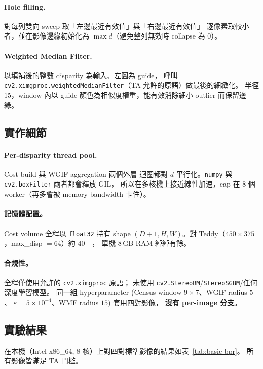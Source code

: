 \documentclass[11pt,a4paper]{article}
\begin{document}
\paragraph{Hole filling.} 對每列雙向 sweep 取「左邊最近有效值」與「右邊最近有效值」
逐像素取較小者，並在影像邊緣初始化為 $\max\!d$（避免整列無效時 collapse 為 0）。

\paragraph{Weighted Median Filter.} 以填補後的整數 disparity 為輸入、左圖為 guide，
呼叫 \texttt{cv2.ximgproc.weightedMedianFilter}（TA 允許的原語）做最後的細緻化。
半徑 15，window 內以 guide 顏色為相似度權重，能有效消除細小 outlier 而保留邊緣。

\subsection{實作細節}
\paragraph{Per-disparity thread pool.} Cost build 與 WGIF aggregation 兩個外層
迴圈都對 $d$ 平行化。\texttt{numpy} 與 \texttt{cv2.boxFilter} 兩者都會釋放 GIL，
所以在多核機上接近線性加速，cap 在 8 個 worker（再多會被 memory bandwidth
卡住）。

\paragraph{記憶體配置。} Cost volume 全程以 \texttt{float32} 持有
shape $(D{+}1, H, W)$。對 Teddy（$450\!\times\!375$，max\_disp $=64$）約 \SI{40}{\mebi\byte}，
單機 8\,GB RAM 綽綽有餘。

\paragraph{合規性。} 全程僅使用允許的 \texttt{cv2.ximgproc} 原語；
未使用 \texttt{cv2.StereoBM}/\texttt{StereoSGBM}/任何深度學習模型。
同一組 hyperparameter (Census window $9\!\times\!7$、WGIF radius $5$、
$\varepsilon=5\!\times\!10^{-4}$、WMF radius $15$) 套用四對影像，
\textbf{沒有 per-image 分支}。

\subsection{實驗結果}
\label{sec:basic-results}
在本機（Intel x86\_64, 8 核）上對四對標準影像的結果如表~\ref{tab:basic-bpr}。
所有影像皆滿足 TA 門檻。
\end{document}
